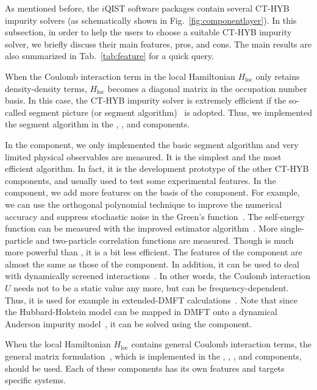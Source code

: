 As mentioned before, the $i$QIST software packages contain several CT-HYB impurity solvers (as schematically shown in Fig.~\ref{fig:componentlayer}). In this subsection, in order to help the users to choose a suitable CT-HYB impurity solver, we briefly discuss their main features, pros, and cons. The main results are also summarized in Tab.~\ref{tab:feature} for a quick query.

When the Coulomb interaction term in the local Hamiltonian $H_{\text{loc}}$ only retains density-density terms, $H_{\text{loc}}$ becomes a diagonal matrix in the occupation number basis. In this case, the CT-HYB impurity solver is extremely efficient if the so-called segment picture (or segment algorithm)~\cite{PhysRevLett.97.076405,RevModPhys.83.349} is adopted. Thus, we implemented the segment algorithm in the {\azalea}, {\gardenia}, and {\narcissus} components.

In the {\azalea} component, we only implemented the basic segment algorithm and very limited physical observables are measured. It is the simplest and the most efficient algorithm. In fact, it is the development prototype of the other CT-HYB components, and usually used to test some experimental features. In the {\gardenia} component, we add more features on the basis of the {\azalea} component. For example, we can use the orthogonal polynomial technique to improve the numerical accuracy and suppress stochastic noise in the Green's function~\cite{PhysRevB.84.075145}. The self-energy function can be measured with the improved estimator algorithm~\cite{PhysRevB.89.235128,PhysRevB.85.205106}. More single-particle and two-particle correlation functions are measured. Though {\gardenia} is much more powerful than {\azalea}, it is a bit less efficient. The features of the {\narcissus} component are almost the same as those of the {\gardenia} component. In addition, it can be used to deal with dynamically screened interactions~\cite{PhysRevLett.104.146401,Werner2012}. In other words, the Coulomb interaction $U$ needs not to be a static value any more, but can be frequency-dependent. Thus, it is used for example in extended-DMFT calculations~\cite{PhysRevB.87.125149}. Note that since the Hubbard-Holstein model can be mapped in DMFT onto a dynamical Anderson impurity model~\cite{PhysRevLett.99.146404}, it can be solved using the {\narcissus} component.

When the local Hamiltonian $H_{\text{loc}}$ contains general Coulomb interaction terms, the general matrix formulation~\cite{PhysRevB.74.155107,PhysRevB.75.155113}, which is implemented in the {\begonia}, {\lavender}, {\pansy}, and {\manjushaka} components, should be used. Each of these components has its own features and targets specific systems.

